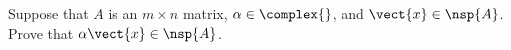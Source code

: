 Suppose that $A$ is an $m\times n$ matrix, $\alpha\in\complex{\null}$, and $\vect{x}\in\nsp{A}$.  Prove that $\alpha\vect{x}\in\nsp{A}$.